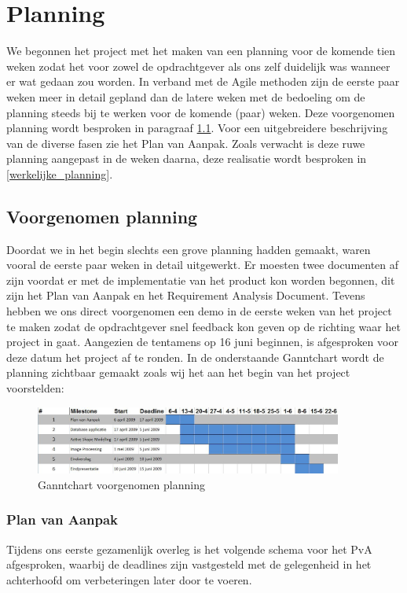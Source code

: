 \section{Planning}
\label{Planning}
We begonnen het project met het maken van een planning voor de komende tien
weken zodat het voor zowel de opdrachtgever als ons zelf duidelijk was wanneer
er wat gedaan zou worden. In verband met de Agile methoden zijn de eerste paar
weken meer in detail gepland dan de latere weken met de bedoeling om de
planning steeds bij te werken voor de komende (paar) weken. Deze voorgenomen
planning wordt besproken in paragraaf \ref{voorgenomen_planning}. Voor een
uitgebreidere beschrijving van de diverse fasen zie het Plan van Aanpak.
Zoals verwacht is deze ruwe planning aangepast in de
weken daarna, deze realisatie wordt besproken in \ref{werkelijke_planning}.

\subsection{Voorgenomen planning}
\label{voorgenomen_planning}
Doordat we in het begin slechts een grove planning hadden gemaakt, waren vooral
de eerste paar weken in detail uitgewerkt.
Er moesten twee documenten af zijn voordat er met de implementatie van het product kon worden begonnen, dit zijn het Plan van Aanpak en het Requirement Analysis Document.
Tevens hebben we ons direct voorgenomen een demo in de eerste weken van het project te maken zodat de opdrachtgever snel feedback kon geven op de richting waar het project in gaat.
Aangezien de tentamens op 16 juni beginnen, is afgesproken voor deze datum het project af te ronden.
In de onderstaande Ganntchart wordt de planning zichtbaar gemaakt zoals wij het aan het begin van het project voorstelden:
\\
\begin{figure}[ht]
\includegraphics[width=0.9\textwidth]{ganntbefore}
\caption{Ganntchart voorgenomen planning}
\label{fig:ganntbefore}
\end{figure}

\subsubsection{Plan van Aanpak}
Tijdens ons eerste gezamenlijk overleg is het volgende schema voor het PvA
afgesproken, waarbij de deadlines zijn vastgesteld met de gelegenheid in het achterhoofd om verbeteringen later door te voeren.

